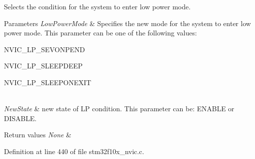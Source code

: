 Selects the condition for the system to enter low power mode. 


\begin{DoxyParams}{Parameters}
{\em Low\+Power\+Mode} & Specifies the new mode for the system to enter low power mode. This parameter can be one of the following values\+: \begin{DoxyItemize}
\item N\+V\+I\+C\+\_\+\+L\+P\+\_\+\+S\+E\+V\+O\+N\+P\+E\+ND \item N\+V\+I\+C\+\_\+\+L\+P\+\_\+\+S\+L\+E\+E\+P\+D\+E\+EP \item N\+V\+I\+C\+\_\+\+L\+P\+\_\+\+S\+L\+E\+E\+P\+O\+N\+E\+X\+IT \end{DoxyItemize}
\\
\hline
{\em New\+State} & new state of LP condition. This parameter can be\+: E\+N\+A\+B\+LE or D\+I\+S\+A\+B\+LE. \\
\hline
\end{DoxyParams}

\begin{DoxyRetVals}{Return values}
{\em None} & \\
\hline
\end{DoxyRetVals}


Definition at line 440 of file stm32f10x\+\_\+nvic.\+c.

